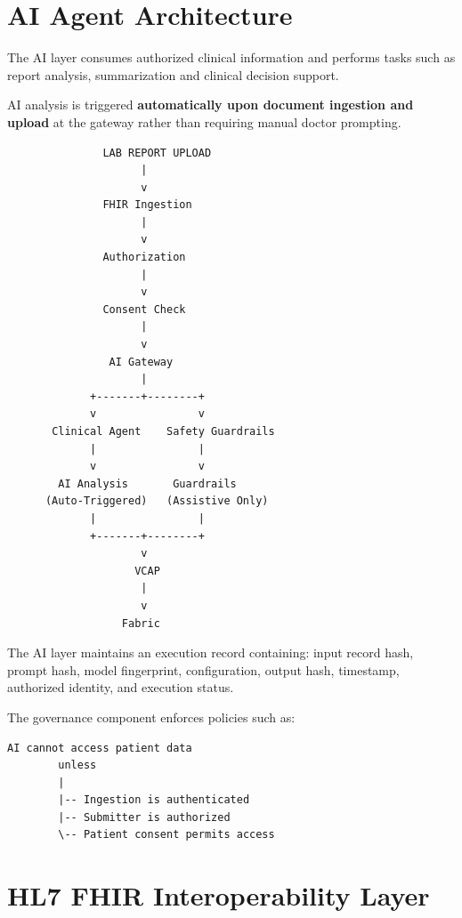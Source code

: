 \documentclass[11pt,a4paper]{article}
\begin{document}
\section{AI Agent Architecture}

The AI layer consumes authorized clinical information and performs tasks such as report analysis, summarization and clinical decision support.

AI analysis is triggered \textbf{automatically upon document ingestion and upload} at the gateway rather than requiring manual doctor prompting.

\begin{lstlisting}
               LAB REPORT UPLOAD
                     |
                     v
               FHIR Ingestion
                     |
                     v
               Authorization
                     |
                     v
               Consent Check
                     |
                     v
                AI Gateway
                     |
             +-------+--------+
             v                v
       Clinical Agent    Safety Guardrails
             |                |
             v                v
        AI Analysis       Guardrails
      (Auto-Triggered)   (Assistive Only)
             |                |
             +-------+--------+
                     v
                    VCAP
                     |
                     v
                  Fabric
\end{lstlisting}

The AI layer maintains an execution record containing: input record hash, prompt hash, model fingerprint, configuration, output hash, timestamp, authorized identity, and execution status.

The governance component enforces policies such as:
\begin{lstlisting}
AI cannot access patient data
        unless
        |
        |-- Ingestion is authenticated
        |-- Submitter is authorized
        \-- Patient consent permits access
\end{lstlisting}

\newpage
\section{HL7 FHIR Interoperability Layer}
\end{document}
